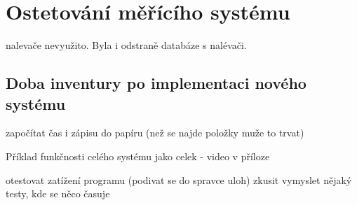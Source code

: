 
\chapter{Ostetování měřícího systému}
nalevače
nevyužito. Byla i odstraně databáze s nalévači.


\section{Doba inventury po implementaci nového systému}

započítat čas i zápisu do papíru (než se najde položky muže to trvat)

Příklad funkčnosti celého systému jako celek - video v příloze

otestovat zatížení programu (podivat se do spravce uloh)
zkusit vymyslet nějaký testy, kde se něco časuje

